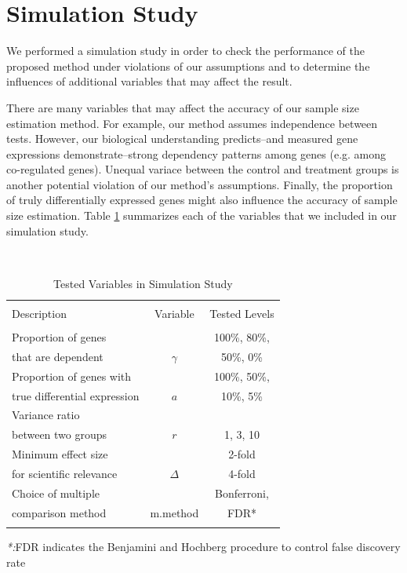 \documentclass{bioinfo}
\begin{document}
\section{Simulation Study}

We performed a simulation study in order to check the performance of
the proposed method under violations of our assumptions and to
determine the influences of additional variables that may affect the
result.

There are many variables that may affect the accuracy of our sample
size estimation method. For example, our method assumes independence
between tests. However, our biological understanding predicts--and
measured gene expressions demonstrate--strong dependency patterns
among genes (e.g. among co-regulated genes).  Unequal variace
between the control and treatment groups is another potential
violation of our method's assumptions. Finally, the proportion of
truly differentially expressed genes might also influence the
accuracy of sample size estimation.  Table \ref{tb:SimuVariables}
summarizes each of the variables that we included in our simulation
study.

\begin{table}\centering
  \caption{Tested Variables in Simulation Study}\ \\
  \begin{tabular}{lcc}
    \hline\hline
    \\
    Description & Variable & Tested Levels \\
    \\
    \hline\hline
    Proportion of genes &          & 100\%, 80\%,  \\
    that are dependent  & $\gamma$ & 50\%,   0\%    \\
    \hline
    Proportion of genes with     &     &  100\%, 50\%,\\
    true differential expression & $a$ &   10\%,  5\% \\
    \hline
    Variance ratio &  &\\
    between two groups & $r$ & 1, 3, 10  \\
    \hline
    Minimum effect size  & &2-fold \\
    for scientific relevance & $\Delta$ & 4-fold \\
    \hline
    Choice of multiple  & & Bonferroni,  \\
    comparison method & m.method & FDR* \\
    \hline\hline\\
  \end{tabular}
  \emph{*:}FDR indicates the Benjamini and Hochberg procedure to
	control false discovery rate 
  \label{tb:SimuVariables}
\end{table}
\end{document}
